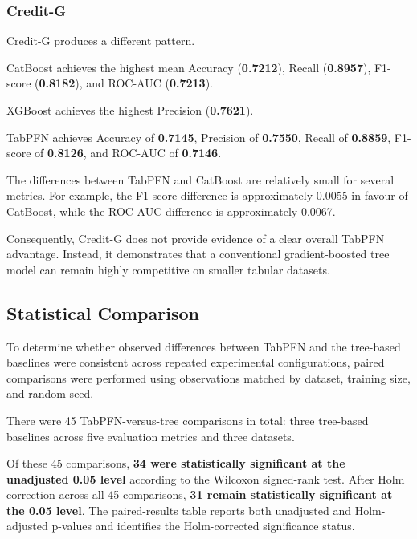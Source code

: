 \subsubsection{Credit-G}



Credit-G produces a different pattern.



CatBoost achieves the highest mean Accuracy (\textbf{0.7212}), Recall (\textbf{0.8957}), F1-score (\textbf{0.8182}), and ROC-AUC (\textbf{0.7213}).



XGBoost achieves the highest Precision (\textbf{0.7621}).



TabPFN achieves Accuracy of \textbf{0.7145}, Precision of \textbf{0.7550}, Recall of \textbf{0.8859}, F1-score of \textbf{0.8126}, and ROC-AUC of \textbf{0.7146}.



The differences between TabPFN and CatBoost are relatively small for several metrics. For example, the F1-score difference is approximately 0.0055 in favour of CatBoost, while the ROC-AUC difference is approximately 0.0067.



Consequently, Credit-G does not provide evidence of a clear overall TabPFN advantage. Instead, it demonstrates that a conventional gradient-boosted tree model can remain highly competitive on smaller tabular datasets.



\subsection{Statistical Comparison}



To determine whether observed differences between TabPFN and the tree-based baselines were consistent across repeated experimental configurations, paired comparisons were performed using observations matched by dataset, training size, and random seed.



There were 45 TabPFN-versus-tree comparisons in total: three tree-based baselines across five evaluation metrics and three datasets.



Of these 45 comparisons, \textbf{34 were statistically significant at the unadjusted 0.05 level} according to the Wilcoxon signed-rank test. After Holm correction across all 45 comparisons, \textbf{31 remain statistically significant at the 0.05 level}. The paired-results table reports both unadjusted and Holm-adjusted p-values and identifies the Holm-corrected significance status.



